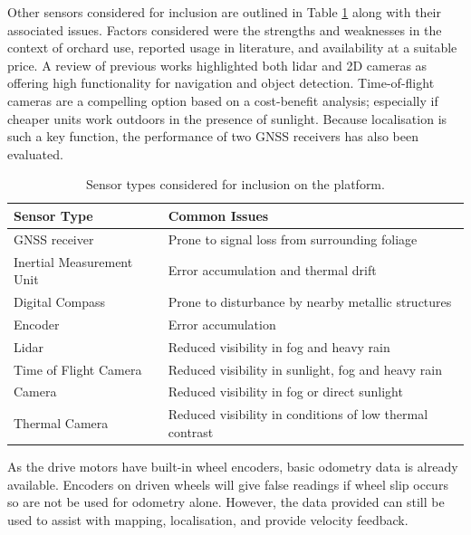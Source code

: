 \documentclass[preprint,authoryear,12pt]{elsarticle}
\begin{document}
    Other sensors considered for inclusion are outlined in Table \ref{table:sensor_comparison} along with their associated issues.
    Factors considered were the strengths and weaknesses in the context of orchard use, reported usage in literature, and availability at a suitable price.
    A review of previous works highlighted both lidar and 2D cameras as offering high functionality for navigation and object detection.
    Time-of-flight cameras are a compelling option based on a cost-benefit analysis; especially if cheaper units work outdoors in the presence of sunlight.
    Because localisation is such a key function, the performance of two GNSS receivers has also been evaluated.

    \begin{table}[htbp]
        \centering
        \footnotesize
        \begin{tabular}{ l l}

            \textbf{Sensor Type}      &\textbf{Common Issues} \\ \hline
            GNSS receiver              & Prone to signal loss from surrounding foliage\\  \hline
            Inertial Measurement Unit & Error accumulation and thermal drift\\ \hline
            Digital Compass           & Prone to disturbance by nearby metallic structures\\ \hline
            Encoder                   & Error accumulation \\ \hline
            Lidar                     & Reduced visibility in fog and heavy rain \\ \hline
            Time of Flight Camera     & Reduced visibility in sunlight, fog and heavy rain \\ \hline
            Camera                    & Reduced visibility in fog or direct sunlight \\ \hline
            Thermal Camera            & Reduced visibility in conditions of low thermal contrast\\ \hline
        \end{tabular}
        \caption{Sensor types considered for inclusion on the platform.}
        \label{table:sensor_comparison}
    \end{table}

    As the drive motors have built-in wheel encoders, basic odometry data is already available.
    Encoders on driven wheels will give false readings if wheel slip occurs so are not be used for odometry alone.
    However, the data provided can still be used to assist with mapping, localisation, and provide velocity feedback.
\end{document}
